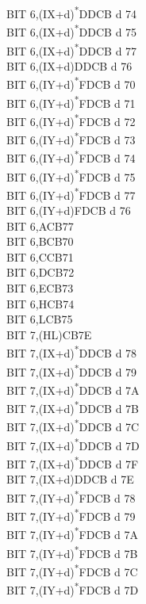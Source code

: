 \documentclass[twoside,openright,a4paper]{book}
\begin{document}
\begin{multicols}{3}
{\begin{tabbing}
	BIT 6,(IX+d)\textsuperscript{*}\>DDCB d 74\\
	BIT 6,(IX+d)\textsuperscript{*}\>DDCB d 75\\
	BIT 6,(IX+d)\textsuperscript{*}\>DDCB d 77\\
	BIT 6,(IX+d)\>DDCB d 76\\
	BIT 6,(IY+d)\textsuperscript{*}\>FDCB d 70\\
	BIT 6,(IY+d)\textsuperscript{*}\>FDCB d 71\\
	BIT 6,(IY+d)\textsuperscript{*}\>FDCB d 72\\
	BIT 6,(IY+d)\textsuperscript{*}\>FDCB d 73\\
	BIT 6,(IY+d)\textsuperscript{*}\>FDCB d 74\\
	BIT 6,(IY+d)\textsuperscript{*}\>FDCB d 75\\
	BIT 6,(IY+d)\textsuperscript{*}\>FDCB d 77\\
	BIT 6,(IY+d)\>FDCB d 76\\
	BIT 6,A\>CB77\\
	BIT 6,B\>CB70\\
	BIT 6,C\>CB71\\
	BIT 6,D\>CB72\\
	BIT 6,E\>CB73\\
	BIT 6,H\>CB74\\
	BIT 6,L\>CB75\\
	BIT 7,(HL)\>CB7E\\
	BIT 7,(IX+d)\textsuperscript{*}\>DDCB d 78\\
	BIT 7,(IX+d)\textsuperscript{*}\>DDCB d 79\\
	BIT 7,(IX+d)\textsuperscript{*}\>DDCB d 7A\\
	BIT 7,(IX+d)\textsuperscript{*}\>DDCB d 7B\\
	BIT 7,(IX+d)\textsuperscript{*}\>DDCB d 7C\\
	BIT 7,(IX+d)\textsuperscript{*}\>DDCB d 7D\\
	BIT 7,(IX+d)\textsuperscript{*}\>DDCB d 7F\\
	BIT 7,(IX+d)\>DDCB d 7E\\
	BIT 7,(IY+d)\textsuperscript{*}\>FDCB d 78\\
	BIT 7,(IY+d)\textsuperscript{*}\>FDCB d 79\\
	BIT 7,(IY+d)\textsuperscript{*}\>FDCB d 7A\\
	BIT 7,(IY+d)\textsuperscript{*}\>FDCB d 7B\\
	BIT 7,(IY+d)\textsuperscript{*}\>FDCB d 7C\\
	BIT 7,(IY+d)\textsuperscript{*}\>FDCB d 7D\\

\end{tabbing}}
\end{multicols}
\end{document}
